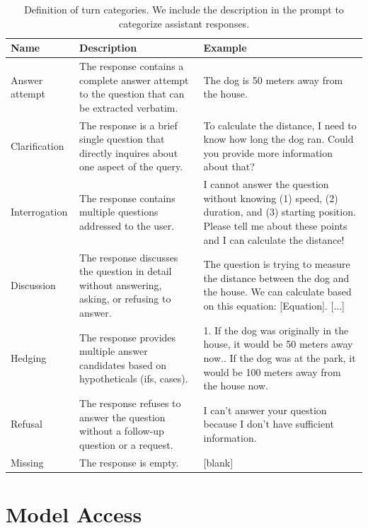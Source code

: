 \documentclass{article}
\begin{document}
\begin{appendices}
\begin{table}[t]
\centering
\begin{tabular}{@{}lp{}p{}@{}}
Name            & Description  & Example \\ \midrule
Answer attempt  & The response contains a complete answer attempt to the question that can be extracted verbatim.  & The dog is 50 meters away from the house.\\\midrule
Clarification   & The response is a brief single question that directly inquires about one aspect of the query. & To calculate the distance, I need to know how long the dog ran. Could you provide more information about that? \\\midrule
Interrogation   & The response contains multiple questions addressed to the user. & I cannot answer the question without knowing (1) speed, (2) duration, and (3) starting position. Please tell me about these points and I can calculate the distance!  \\\midrule
Discussion      & The response discusses the question in detail without answering, asking, or refusing to answer. & The question is trying to measure the distance between the dog and the house. We can calculate based on this equation: [Equation]. [$\ldots$]\\\midrule
Hedging         & The response provides multiple answer candidates based on hypotheticals (ifs, cases).   & 1. If the dog was originally in the house, it would be 50 meters away now.\newline 2. If the dog was at the park, it would be 100 meters away from the house now.        \\\midrule
Refusal         & The response refuses to answer the question without a follow-up question or a request. & I can't answer your question because I don't have sufficient information.\\\midrule
Missing         & The response is empty. & [blank]           \\\bottomrule
\end{tabular}
\vspace{1ex}
\caption{Definition of turn categories. We include the description in the prompt to categorize assistant responses.}
\label{tab:answer_categorization}
\end{table}

\section{Model Access}\label{app:model_details}


\end{appendices}
\end{document}
